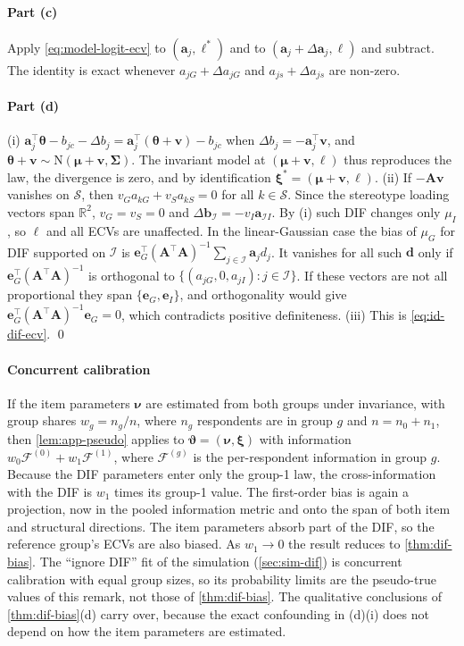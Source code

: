 \paragraph{Part (c)}
Apply \eqref{eq:model-logit-ecv} to $(\bm a_j,\bm\ell^*)$ and to $(\bm a_j+\Delta\bm a_j,\bm\ell)$ and subtract. The identity is exact whenever $a_{jG}+\Delta a_{jG}$ and $a_{js}+\Delta a_{js}$ are non-zero.

\paragraph{Part (d)}
(i) $\bm a_j^\top\bm\theta-b_{jc}-\Delta b_j=\bm a_j^\top(\bm\theta+\bm v)-b_{jc}$ when $\Delta b_j=-\bm a_j^\top\bm v$, and $\bm\theta+\bm v\sim\mathrm N(\bm\mu+\bm v,\bm\Sigma)$. The invariant model at $(\bm\mu+\bm v,\bm\ell)$ thus reproduces the law, the divergence is zero, and by identification $\bm\xi^*=(\bm\mu+\bm v,\bm\ell)$.
(ii) If $-\bm A\bm v$ vanishes on $\mathcal S$, then $v_Ga_{kG}+v_Sa_{kS}=0$ for all $k\in\mathcal S$. Since the stereotype loading vectors span $\mathbb R^2$, $v_G=v_S=0$ and $\Delta\bm b_{\mathcal I}=-v_I\bm a_{\mathcal II}$. By (i) such DIF changes only $\mu_I$, so $\bm\ell$ and all ECVs are unaffected. In the linear-Gaussian case the bias of $\mu_G$ for DIF supported on $\mathcal I$ is $\bm e_G^\top(\bm A^\top\bm A)^{-1}\sum_{j\in\mathcal I}\bm a_jd_j$. It vanishes for all such $\bm d$ only if $\bm e_G^\top(\bm A^\top\bm A)^{-1}$ is orthogonal to $\{(a_{jG},0,a_{jI}):j\in\mathcal I\}$. If these vectors are not all proportional they span $\{\bm e_G,\bm e_I\}$, and orthogonality would give $\bm e_G^\top(\bm A^\top\bm A)^{-1}\bm e_G=0$, which contradicts positive definiteness.
(iii) This is \eqref{eq:id-dif-ecv}. \qed

\paragraph{Concurrent calibration}
\begin{remark}\label{rem:id-concurrent}
If the item parameters $\bm\nu$ are estimated from both groups under invariance, with group shares $w_g=n_g/n$, where $n_g$ respondents are in group $g$ and $n=n_0+n_1$, then \cref{lem:app-pseudo} applies to $\bm\vartheta=(\bm\nu,\bm\xi)$ with information $w_0\bm{\mathcal F}^{(0)}+w_1\bm{\mathcal F}^{(1)}$, where $\bm{\mathcal F}^{(g)}$ is the per-respondent information in group $g$. Because the DIF parameters enter only the group-1 law, the cross-information with the DIF is $w_1$ times its group-1 value. The first-order bias is again a projection, now in the pooled information metric and onto the span of both item and structural directions. The item parameters absorb part of the DIF, so the reference group's ECVs are also biased. As $w_1\to0$ the result reduces to \cref{thm:dif-bias}. The ``ignore DIF'' fit of the simulation (\cref{sec:sim-dif}) is concurrent calibration with equal group sizes, so its probability limits are the pseudo-true values of this remark, not those of \cref{thm:dif-bias}. The qualitative conclusions of \cref{thm:dif-bias}(d) carry over, because the exact confounding in (d)(i) does not depend on how the item parameters are estimated.
\end{remark}


